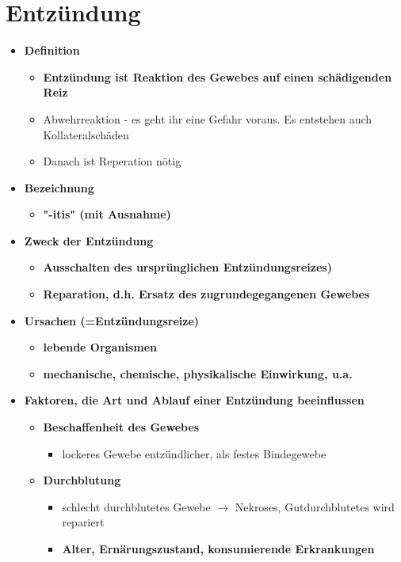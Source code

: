 \section{Entzündung}
	\begin{itemize}
		\item \textbf{Definition}
			\begin{itemize}
				\item \textbf{Entzündung ist Reaktion des Gewebes auf einen schädigenden Reiz}
				\item Abwehrreaktion - es geht ihr eine Gefahr voraus. Es entstehen auch Kollateralschäden 
				\item Danach ist Reperation nötig
			\end{itemize}
		\item \textbf{Bezeichnung}
			\begin{itemize}
				\item \textbf{"-itis" (mit Ausnahme)}
			\end{itemize}
		\item \textbf{Zweck der Entzündung}
			\begin{itemize}
				\item \textbf{Ausschalten des ursprünglichen Entzündungsreizes)}
				\item \textbf{Reparation, d.h. Ersatz des zugrundegegangenen Gewebes}
			\end{itemize}
		\item \textbf{Ursachen (=Entzündungsreize)}
			\begin{itemize}
				\item \textbf{lebende Organismen}
				\item \textbf{mechanische, chemische, physikalische Einwirkung, u.a.}
			\end{itemize}
		\item \textbf{Faktoren, die Art und Ablauf einer Entzündung beeinflussen}
			\begin{itemize}
				\item \textbf{Beschaffenheit des Gewebes}
					\begin{itemize}
						\item lockeres Gewebe entzündlicher, als festes Bindegewebe
					\end{itemize}
				\item \textbf{Durchblutung}
					\begin{itemize}
						\item schlecht durchblutetes Gewebe $\rightarrow$ Nekroses, Gutdurchblutetes wird repariert
				\item \textbf{Alter, Ernärungszustand, konsumierende Erkrankungen}

\end{itemize}
\end{itemize}
\end{itemize}

